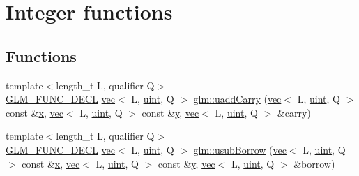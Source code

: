 \hypertarget{group__core__func__integer}{}\section{Integer functions}
\label{group__core__func__integer}
\subsection*{Functions}
\begin{DoxyCompactItemize}
\item 
{\footnotesize template$<$length\+\_\+t L, qualifier Q$>$ }\\\hyperlink{setup_8hpp_ab2d052de21a70539923e9bcbf6e83a51}{G\+L\+M\+\_\+\+F\+U\+N\+C\+\_\+\+D\+E\+CL} \hyperlink{structglm_1_1vec}{vec}$<$ L, \hyperlink{group__core__precision_ga4fd29415871152bfb5abd588334147c8}{uint}, Q $>$ \hyperlink{group__core__func__integer_gaedcec48743632dff6786bcc492074b1b}{glm\+::uadd\+Carry} (\hyperlink{structglm_1_1vec}{vec}$<$ L, \hyperlink{group__core__precision_ga4fd29415871152bfb5abd588334147c8}{uint}, Q $>$ const \&\hyperlink{_s_d_l__opengl_8h_ad0e63d0edcdbd3d79554076bf309fd47}{x}, \hyperlink{structglm_1_1vec}{vec}$<$ L, \hyperlink{group__core__precision_ga4fd29415871152bfb5abd588334147c8}{uint}, Q $>$ const \&\hyperlink{_s_d_l__opengl_8h_a1675d9d7bb68e1657ff028643b4037e3}{y}, \hyperlink{structglm_1_1vec}{vec}$<$ L, \hyperlink{group__core__precision_ga4fd29415871152bfb5abd588334147c8}{uint}, Q $>$ \&carry)
\item 
{\footnotesize template$<$length\+\_\+t L, qualifier Q$>$ }\\\hyperlink{setup_8hpp_ab2d052de21a70539923e9bcbf6e83a51}{G\+L\+M\+\_\+\+F\+U\+N\+C\+\_\+\+D\+E\+CL} \hyperlink{structglm_1_1vec}{vec}$<$ L, \hyperlink{group__core__precision_ga4fd29415871152bfb5abd588334147c8}{uint}, Q $>$ \hyperlink{group__core__func__integer_gae3316ba1229ad9b9f09480833321b053}{glm\+::usub\+Borrow} (\hyperlink{structglm_1_1vec}{vec}$<$ L, \hyperlink{group__core__precision_ga4fd29415871152bfb5abd588334147c8}{uint}, Q $>$ const \&\hyperlink{_s_d_l__opengl_8h_ad0e63d0edcdbd3d79554076bf309fd47}{x}, \hyperlink{structglm_1_1vec}{vec}$<$ L, \hyperlink{group__core__precision_ga4fd29415871152bfb5abd588334147c8}{uint}, Q $>$ const \&\hyperlink{_s_d_l__opengl_8h_a1675d9d7bb68e1657ff028643b4037e3}{y}, \hyperlink{structglm_1_1vec}{vec}$<$ L, \hyperlink{group__core__precision_ga4fd29415871152bfb5abd588334147c8}{uint}, Q $>$ \&borrow)
\item 

\end{DoxyCompactItemize}
